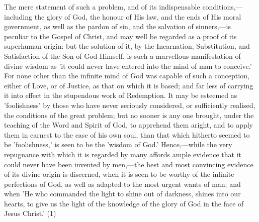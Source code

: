 \documentclass[
]{book}
\begin{document}
The mere statement of such a problem, and of its indispensable conditions,---including the glory of God, the honour of His law, and the ends of His moral government, as well as the pardon of sin, and the salvation of sinners,---is peculiar to the Gospel of Christ, and may well be regarded as a proof of its superhuman origin: but the solution of it, by the Incarnation, Substitution, and Satisfaction of the Son of God Himself, is such a marvellous manifestation of divine wisdom as 'it could never have entered into the mind of man to conceive.' For none other than the infinite mind of God was capable of such a conception, either of Love, or of Justice, as that on which it is based; and far less of carrying it into effect in the stupendous work of Redemption. It may be esteemed as 'foolishness' by those who have never seriously considered, or sufficiently realised, the conditions of the great problem; but no sooner is any one brought, under the teaching of the Word and Spirit of God, to apprehend them aright, and to apply them in earnest to the case of his own soul, than that which hitherto seemed to be 'foolishness,' is seen to be the 'wisdom of God.' Hence,---while the very repugnance with which it is regarded by many affords ample evidence that it could never have been invented by men,---the best and most convincing evidence of its divine origin is discerned, when it is seen to be worthy of the infinite perfections of God, as well as adapted to the most urgent wants of man; and when 'He who commanded the light to shine out of darkness, shines into our hearts, to give us the light of the knowledge of the glory of God in the face of Jesus Christ.' (1)
\end{document}
